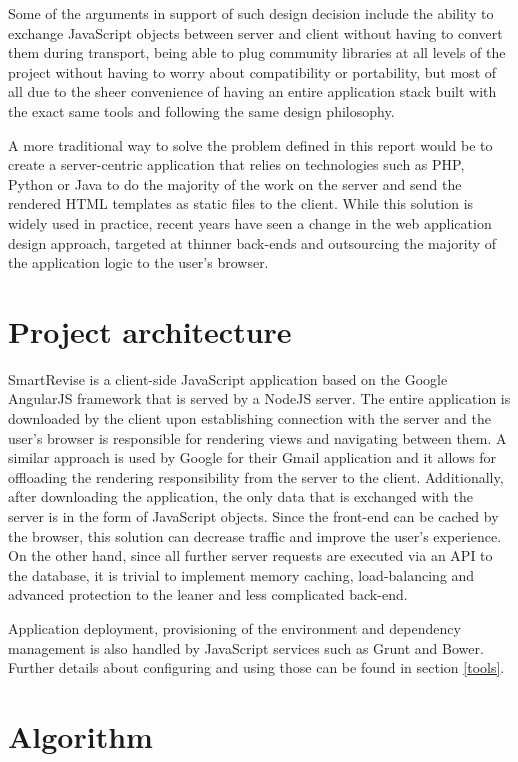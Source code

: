 \documentclass[bsc,frontabs,twoside,singlespacing,parskip]{infthesis}     %
\begin{document}
	Some of the arguments in support of such design decision include the ability to exchange JavaScript objects between server and client without having to convert them during transport, being able to plug community libraries at all levels of the project without having to worry about compatibility or portability, but most of all due to the sheer convenience of having an entire application stack built with the exact same tools and following the same design philosophy. 
	
	A more traditional way to solve the problem defined in this report would be to create a server-centric application that relies on technologies such as PHP, Python or Java to do the majority of the work on the server and send the rendered HTML templates as static files to the client. While this solution is widely used in practice, recent years have seen a change in the web application design approach, targeted at thinner back-ends and outsourcing the majority of the application logic to the user's browser.

	\section{Project architecture}
	
		SmartRevise is a client-side JavaScript application based on the Google AngularJS framework that is served by a NodeJS server. The entire application is downloaded by the client upon establishing connection with the server and the user's browser is responsible for rendering views and navigating between them. A similar approach is used by Google for their Gmail application and it allows for offloading the rendering responsibility from the server to the client. Additionally, after downloading the application, the only data that is exchanged with the server is in the form of JavaScript objects. Since the front-end can be cached by the browser, this solution can decrease traffic and improve the user's experience. On the other hand, since all further server requests are executed via an API to the database, it is trivial to implement memory caching, load-balancing and advanced protection to the leaner and less complicated back-end.
		
		Application deployment, provisioning of the environment and dependency management is also handled by JavaScript services such as Grunt and Bower. Further details about configuring and using those can be found in section \ref{tools}.
	
	\section{Algorithm}\label{algo}
	
\end{document}
